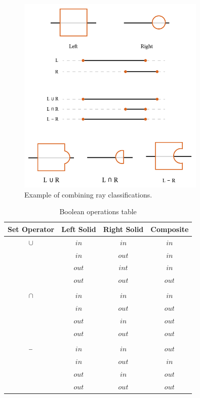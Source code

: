 \documentclass[a4paper,11pt,oneside]{article}
\newcommand{\minus}{\scalebox{0.9}[1.0]{$-$}} %
\begin{document}
\begin{figure}[ht]
	\begin{center}
		\includegraphics[width=0.8\textwidth]{section3/3.3/ray-classifications.png}
	\end{center}
	\caption{Example of combining ray classifications.}
	\label{sec3.3:classification}
\end{figure}

\begin{table}[h]
	\centering
	\caption{Boolean operations table}
	\label{section3:boolean_algebra}
	\begin{tabular}{||c c c c||} 
		\hline
		Set Operator & Left Solid & Right Solid & Composite \\ [0.5ex] 
		\hline\hline
		$\cup$       & $in$       & $in$        & $in$      \\
		             & $in$       & $out$       & $in$      \\
		             & $out$      & $int$       & $in$      \\
		             & $out$      & $out$       & $out$     \\
		             &            &             &           \\
		$\cap$       & $in$       & $in$        & $in$      \\
		             & $in$       & $out$       & $out$     \\
		             & $out$      & $in$        & $out$     \\
		             & $out$      & $out$       & $out$     \\
		             &            &             &           \\
		$\minus$     & $in$       & $in$        & $out$     \\
		             & $in$       & $out$       & $in$      \\
		             & $out$      & $in$        & $out$     \\
		             & $out$      & $out$       & $out$     \\		 	   	
		\hline
	\end{tabular}
\end{table}
\end{document}

